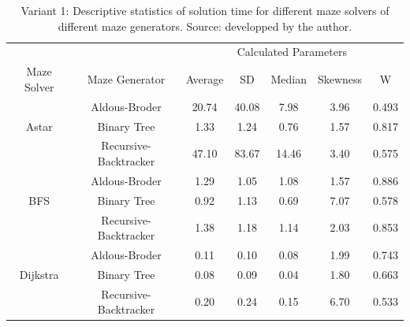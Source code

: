 \begin{table}[!ht]
    \centering
    \caption{Variant 1: Descriptive statistics of solution time for different maze solvers of different maze generators. Source: developped by the author.} 
    \begin{tabular}{c c c c c c c}
    \hline
       ~&~&\multicolumn{5}{c}{Calculated Parameters}\\
       Maze Solver & Maze Generator & Average & SD & Median & Skewness & W\\ \hline \hline
        ~ & Aldous-Broder  & 20.74 & 40.08 & 7.98 & 3.96 & 0.493\\ 
        Astar & Binary Tree & 1.33 & 1.24 & 0.76 & 1.57 & 0.817\\ 
        ~ & Recursive-Backtracker & 47.10 & 83.67 & 14.46 & 3.40 & 0.575\\ \hline
        ~ & Aldous-Broder  & 1.29 & 1.05 & 1.08 & 1.57 & 0.886\\ 
        BFS & Binary Tree & 0.92 & 1.13 & 0.69 & 7.07 & 0.578\\ 
        ~ & Recursive-Backtracker & 1.38 & 1.18 & 1.14 & 2.03 & 0.853\\ \hline
        ~ & Aldous-Broder  & 0.11 & 0.10 & 0.08 & 1.99 & 0.743\\ 
        Dijkstra & Binary Tree & 0.08 & 0.09 & 0.04 & 1.80 & 0.663\\ 
        ~ & Recursive-Backtracker & 0.20 & 0.24 & 0.15 & 6.70 & 0.533 \\ \hline
    \end{tabular}
\end{table}

